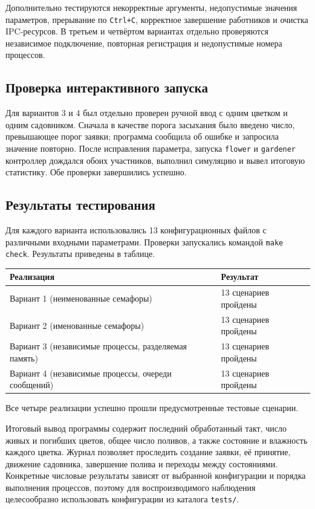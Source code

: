 \documentclass[12pt,a4paper]{article}
\begin{document}
Дополнительно тестируются некорректные аргументы, недопустимые значения параметров, прерывание по \texttt{Ctrl+C}, корректное завершение работников и очистка IPC-ресурсов. В третьем и четвёртом вариантах отдельно проверяются независимое подключение, повторная регистрация и недопустимые номера процессов.

\subsection{Проверка интерактивного запуска}
Для вариантов 3 и 4 был отдельно проверен ручной ввод с одним цветком и одним садовником. Сначала в качестве порога засыхания было введено число, превышающее порог заявки; программа сообщила об ошибке и запросила значение повторно. После исправления параметра, запуска \texttt{flower} и \texttt{gardener} контроллер дождался обоих участников, выполнил симуляцию и вывел итоговую статистику. Обе проверки завершились успешно.

\subsection{Результаты тестирования}
Для каждого варианта использовались 13 конфигурационных файлов с различными входными параметрами. Проверки запускались командой \texttt{make check}. Результаты приведены в таблице.

\begin{longtable}{|p{}|p{}|}
\hline
Реализация & Результат \\ \hline
\endhead
Вариант 1 (неименованные семафоры) & 13 сценариев пройдены \\ \hline
Вариант 2 (именованные семафоры) & 13 сценариев пройдены \\ \hline
Вариант 3 (независимые процессы, разделяемая память) & 13 сценариев пройдены \\ \hline
Вариант 4 (независимые процессы, очереди сообщений) & 13 сценариев пройдены \\ \hline
\end{longtable}

Все четыре реализации успешно прошли предусмотренные тестовые сценарии.

Итоговый вывод программы содержит последний обработанный такт, число живых и погибших цветов, общее число поливов, а также состояние и влажность каждого цветка. Журнал позволяет проследить создание заявки, её принятие, движение садовника, завершение полива и переходы между состояниями. Конкретные числовые результаты зависят от выбранной конфигурации и порядка выполнения процессов, поэтому для воспроизводимого наблюдения целесообразно использовать конфигурации из каталога \texttt{tests/}.
\end{document}
